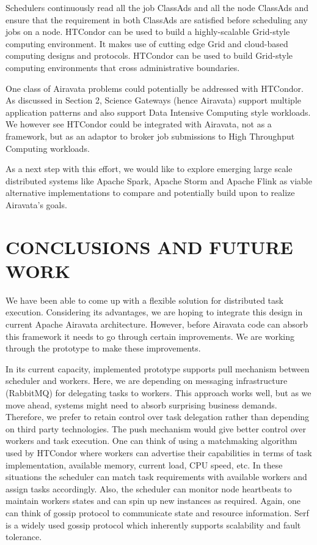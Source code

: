 \documentclass[review]{elsarticle}
\begin{document}
Schedulers continuously read all the job ClassAds and all the node ClassAds and ensure that the requirement in both ClassAds are satisfied before scheduling any jobs on a node. HTCondor can be used to build a highly-scalable Grid-style computing environment.  It makes use of cutting edge Grid and cloud-based computing designs and protocols. HTCondor can be used to build Grid-style computing environments that cross administrative boundaries. 

One class of Airavata problems could potentially be addressed with HTCondor. As discussed in Section 2,  Science Gateways (hence Airavata) support multiple application patterns and also support Data Intensive Computing style workloads. We however see HTCondor could be integrated with Airavata, not as a framework, but as an adaptor to broker job submissions to High Throughput Computing workloads.   

As a next step with this effort, we would like to explore emerging large scale distributed systems like Apache Spark, Apache Storm and Apache Flink as viable alternative implementations to compare and potentially build upon to realize Airavata's goals. 


\section{CONCLUSIONS AND FUTURE WORK}
We have been able to come up with a flexible solution for distributed task execution. Considering its advantages, we are hoping to integrate this design in current Apache Airavata architecture. However, before Airavata code can absorb this framework it needs to go through certain improvements. We are working through the prototype to make these improvements. 

In its current capacity, implemented prototype supports pull mechanism between scheduler and workers. Here, we are depending on messaging infrastructure (RabbitMQ) for delegating tasks to workers. This approach works well, but as we move ahead, systems might need to absorb surprising business demands.  Therefore, we prefer to retain control over task delegation rather than depending on third party technologies. The push mechanism would give better control over workers and task execution. One can think of using a matchmaking algorithm used by HTCondor where workers can advertise their capabilities in terms of task implementation, available memory, current load, CPU speed, etc.  In these situations the scheduler can match task requirements with available workers and assign tasks accordingly. Also, the scheduler can monitor node heartbeats to maintain workers states and can spin up new instances as required. Again, one can think of gossip protocol to communicate state and resource information. Serf is a widely used gossip protocol which inherently supports scalability and fault tolerance. 
\end{document}
